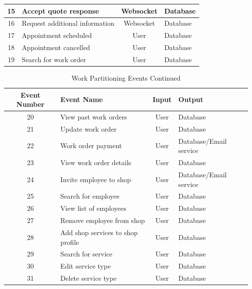 \documentclass[12pt]{article}
\begin{document}
\begin{table}[H]
\begin{tabular}{|c|p{3.5cm}|c|p{3.5cm}|}
		15                    & Accept quote response          & Websocket      & Database           \\
		\hline
		16                    & Request additional information & Websocket      & Database           \\
		\hline
		17                    & Appointment scheduled          & User           & Database           \\
		\hline
		18                    & Appointment cancelled          & User           & Database           \\
		\hline
		19                    & Search for work order          & User           & Database           \\
		\hline
	\end{tabular}
\end{table}

\begin{table}[H]
	\caption{Work Partitioning Events Continued}
	\centering
	\begin{tabular}{|c|p{3.5cm}|c|p{3.5cm}|}
		\hline
		\textbf{Event Number} & \centering\textbf{Event Name}     & \textbf{Input} & \textbf{Output}        \\
		\hline
		20                    & View past work orders             & User           & Database               \\
		\hline
		21                    & Update work order                 & User           & Database               \\
		\hline
		22                    & Work order payment                & User           & Database/Email service \\
		\hline
		23                    & View work order details           & User           & Database               \\
		\hline
		24                    & Invite employee to shop           & User           & Database/Email service \\
		\hline
		25                    & Search for employee               & User           & Database               \\
		\hline
		26                    & View list of employees            & User           & Database               \\
		\hline
		27                    & Remove employee from shop         & User           & Database               \\
		\hline
		28                    & Add shop services to shop profile & User           & Database               \\
		\hline
		29                    & Search for service                & User           & Database               \\
		\hline
		30                    & Edit service type                 & User           & Database               \\
		\hline
		31                    & Delete service type               & User           & Database               \\
		\hline
	\end{tabular}
\end{table}
\end{document}
